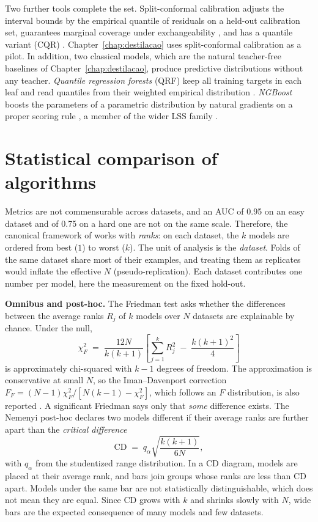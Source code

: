 Two further tools complete the set. Split-conformal calibration adjusts the interval bounds by the empirical quantile of residuals on a held-out calibration set, guarantees marginal coverage under exchangeability \citep{vovk2005}, and has a
quantile variant (CQR) \citep{romano2019}.
Chapter~\ref{chap:destilacao} uses split-conformal calibration as a pilot. In addition, two classical models, which are the natural teacher-free baselines of Chapter~\ref{chap:destilacao}, produce predictive distributions without any teacher. \emph{Quantile regression forests} (QRF) keep
all training targets in each leaf and read quantiles from their
weighted empirical distribution \citep{meinshausen2006}.
\emph{NGBoost} boosts the parameters of a parametric distribution by
natural gradients on a proper scoring rule \citep{duan2020}, a member of the wider LSS family
\citep{marz2019}.

\section{Statistical comparison of algorithms}
\label{sec:fund-estatistica}

Metrics are not commensurable across datasets, and an AUC of 0.95 on an easy dataset and of 0.75 on a hard one are not
on the same scale. Therefore, the canonical framework of
\citet{demsar2006} works with \emph{ranks}: on each dataset, the $k$
models are ordered from best ($1$) to worst ($k$). The unit of
analysis is the \emph{dataset}. Folds of the same dataset share most
of their examples, and treating them as replicates would inflate the
effective $N$ (pseudo-replication). Each dataset contributes one number per model, here the
measurement on the fixed hold-out.

\textbf{Omnibus and post-hoc.} The Friedman test \citep{friedman1937}
asks whether the differences between the average ranks $R_j$ of $k$
models over $N$ datasets are explainable by chance. Under the null,
\begin{equation}
  \chi^2_F \;=\; \frac{12N}{k(k+1)}
  \left[ \sum_{j=1}^{k} R_j^2 \;-\; \frac{k(k+1)^2}{4} \right]
  \label{eq:friedman}
\end{equation}
is approximately chi-squared with $k-1$ degrees of freedom. The
approximation is conservative at small $N$, so the Iman--Davenport correction $F_F = (N-1)\chi^2_F / [N(k-1) - \chi^2_F]$, which follows an $F$ distribution, is also reported \citep{imandavenport1980}. A significant Friedman says only that \emph{some} difference
exists. The Nemenyi post-hoc \citep{nemenyi1963} declares two
models different if their average ranks are further apart than the
\emph{critical difference}
\begin{equation}
  \mathrm{CD} \;=\; q_\alpha \sqrt{\frac{k(k+1)}{6N}},
  \label{eq:cd}
\end{equation}
with $q_\alpha$ from the studentized range distribution. In a CD
diagram, models are placed at their average rank, and bars join
groups whose ranks are less than CD apart. Models under the same bar
are not statistically distinguishable, which does not mean they are equal. Since CD grows with $k$ and shrinks slowly with $N$, wide
bars are the expected consequence of many models and few datasets.

